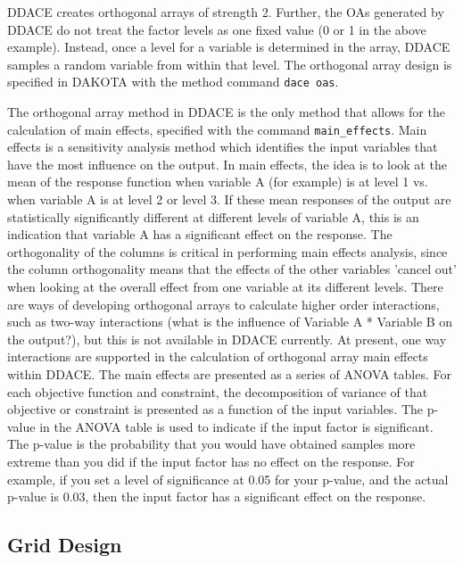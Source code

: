 DDACE creates orthogonal arrays of strength 2.  Further, 
the OAs generated by DDACE do not treat the factor levels as one 
fixed value (0 or 1 in the above example).  Instead, once a level 
for a variable is determined in the array,  DDACE 
samples a random variable from within that level.
The orthogonal array design is specified in 
DAKOTA with the method command \texttt{dace oas}. 

The orthogonal array method in DDACE is the only method that 
allows for the calculation of main effects, specified with the 
command \texttt{main\_effects}.  Main effects is a sensitivity analysis 
method which identifies the input variables that have the most 
influence on the output.  In main effects, the idea is to look 
at the mean of the response function when variable A (for example) 
is at level 1 vs. when variable A is at level 2 or level 3.  
If these mean responses of the output are statistically significantly 
different at different levels of variable A, this is an indication that 
variable A has a significant effect on the response.  
The orthogonality of the columns is critical in performing 
main effects analysis, since the column orthogonality means 
that the effects of the other variables 'cancel out' when 
looking at the overall effect from one variable at its different 
levels.  There are ways of developing orthogonal arrays to calculate 
higher order interactions, such as two-way interactions (what 
is the influence of Variable A * Variable B on the output?), but this is 
not available in DDACE currently.  At present, one way interactions 
are supported in the calculation of orthogonal array main effects within DDACE.
The main effects are presented as a series of ANOVA tables. 
For each objective function and constraint, the decomposition of variance 
of that objective or constraint is presented as a function of the 
input variables.  The p-value in the ANOVA table is used to indicate 
if the input factor is significant.  The p-value is the probability that 
you would have obtained samples more extreme than you did if the input 
factor has no effect on the response.  For example, if you set a level 
of significance at 0.05 for your p-value, and the actual p-value is 0.03, 
then the input factor has a significant effect on the response. 

\subsection{Grid Design}\label{dace:grid}

